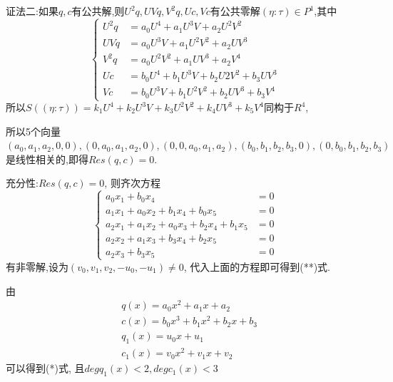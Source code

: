 \documentclass[UTF8]{book}
\begin{document}
			
			证法二:如果$ q,c $有公共解,则$U^{2}q, UVq, V^{2}q, Uc, Vc $有公共零解$(\eta:\tau)\in P^{1}$,其中
			\begin{equation*}
			  \left\{
			   \begin{aligned}
			   U^{2}q &=a_{0}U^{4}+a_{1}U^{3}V+a_{2}U^{2}V^{2} \\
			  UVq &= a_{0}U^{3}V+a_{1}U^{2}V^{2}+a_{2}UV^{3}\\
			    V^{2}q &= a_{0}U^{2}V^{2}+a_{1}UV^{3}+a_{2}V^{4}\\
			   Uc &= b_{0}U^{4}+b_{1}U^{3}V+b_{2}U{2}V^{2}+b_{3}UV^{3}\\
			    Vc &=b_{0}U^{3}V+b_{1}U^{2}V^{2}+b_{2}UV^{3}+b_{3}V^{4}
			   \end{aligned}
			   \right.
			\end{equation*}
			   所以$S((\eta:\tau))=k_{1}U^{4}+k_{2}U^{3}V+k_{3}U^{2}V^{2}+k_{4}UV^{3}+k_{5}V^{4}$同构于$R^{4}$,
			
			   所以5个向量$(a_{0},a_{1},a_{2},0,0),(0,a_{0},a_{1},a_{2},0), (0,0,a_{0}, a_{1},a_{2}),(b_{0}, b_{1},b_{2},b_{3},0), (0,b_{0},b_{1},b_{2},b_{3})$是线性相关的,即得$ Res(q,c)=0 $.
			
			   充分性:$ Res(q,c)=0 $, 则齐次方程
			   \begin{equation*}
			  \left\{
			   \begin{aligned}
			   a_{0}x_{1}+b_{0}x_{4} &=0 \\
			  a_{1}x_{1}+a_{0}x_{2}+b_{1}x_{4}+b_{0}x_{5} &=0\\
			    a_{2}x_{1}+a_{1}x_{2}+a_{0}x_{3}+b_{2}x_{4}+b_{1}x_{5} &=0\\
			    a_{2}x_{2}+a_{1}x_{3}+b_{3}x_{4}+b_{2}x_{5} &=0\\
			    a_{2}x_{3}+b_{3}x_{5} &=0
			   \end{aligned}
			   \right.
			   \end{equation*}
			   有非零解,设为$(v_{0},v_{1},v_{2},-u_{0},-u_{1})\neq0$, 代入上面的方程即可得到(**)式.
			
			   由
			   \begin{equation*}
			     \begin{aligned}
			   &q(x) =a_{0}x^{2}+a_{1}x+a_{2} \\
			 & c(x) =b_{0}x^{3}+b_{1}x^{2}+b_{2}x+b_{3}\\
			 & q_{1}(x) =u_{0}x+u_{1}\\
			 &  c_{1}(x) =v_{0}x^{2}+v_{1}x+v_{2}
			   \end{aligned}
			  \end{equation*}
			  可以得到(*)式, 且$deg q_{1}(x)<2,deg c_{1}(x)<3$
			
\end{document}
